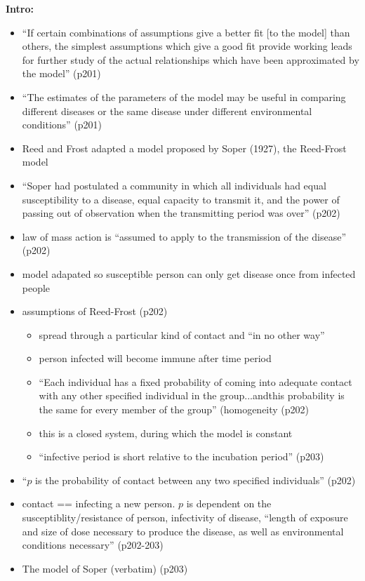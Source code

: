 \documentclass{article}
\begin{document}
\textbf{Intro:}
\begin{itemize}
\item ``If certain combinations of assumptions give a better fit [to the model] than others, the simplest assumptions which give a good fit provide working leads for further study of the actual relationships which have been approximated by the model'' (p201)
\item ``The estimates of the parameters of the model may be useful in comparing different diseases or the same disease under different environmental conditions'' (p201)
\item Reed and Frost adapted a model proposed by Soper (1927), the Reed-Frost model
\item ``Soper had postulated a community in which all individuals had equal susceptibility to a disease, equal capacity to transmit it, and the power of passing out of observation when the transmitting period was over'' (p202)
\item law of mass action is ``assumed to apply to the transmission of the disease'' (p202)
\item model adapated so susceptible person can only get disease once from infected people
\item assumptions of Reed-Frost (p202)
  \begin{itemize}
  \item spread through a particular kind of contact and ``in no other way''
  \item person infected will become immune after time period
  \item ``Each individual has a fixed probability of coming into adequate contact with any other specified individual in the group...andthis probability is the same for every member of the group'' (homogeneity (p202)
  \item this is a closed system, during which the model is constant
  \item ``infective period is short relative to the incubation period'' (p203)
  \end{itemize}
\item ``$p$ is the probability of contact between any two specified individuals'' (p202)
\item contact == infecting a new person.  $p$ is dependent on the susceptiblity/resistance of person, infectivity of disease, ``length of exposure and size of dose necessary to produce the disease, as well as environmental conditions necessary'' (p202-203)
\item  The model of Soper (verbatim)  (p203)

\end{itemize}
\end{document}
